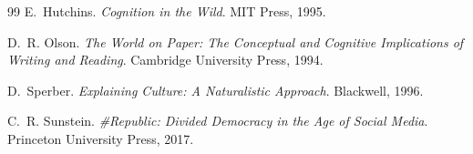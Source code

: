 \documentclass[12pt,a4paper]{article}
\theoremstyle{definition}
\theoremstyle{plain}
\theoremstyle{remark}
\begin{document}
\begin{thebibliography}{99}
E.~Hutchins.
\newblock \emph{Cognition in the Wild}.
\newblock MIT Press, 1995.

D.~R. Olson.
\newblock \emph{The World on Paper: The Conceptual and Cognitive Implications of
Writing and Reading}.
\newblock Cambridge University Press, 1994.

D.~Sperber.
\newblock \emph{Explaining Culture: A Naturalistic Approach}.
\newblock Blackwell, 1996.

C.~R. Sunstein.
\newblock \emph{\#Republic: Divided Democracy in the Age of Social Media}.
\newblock Princeton University Press, 2017.

\end{thebibliography}
\end{document}
